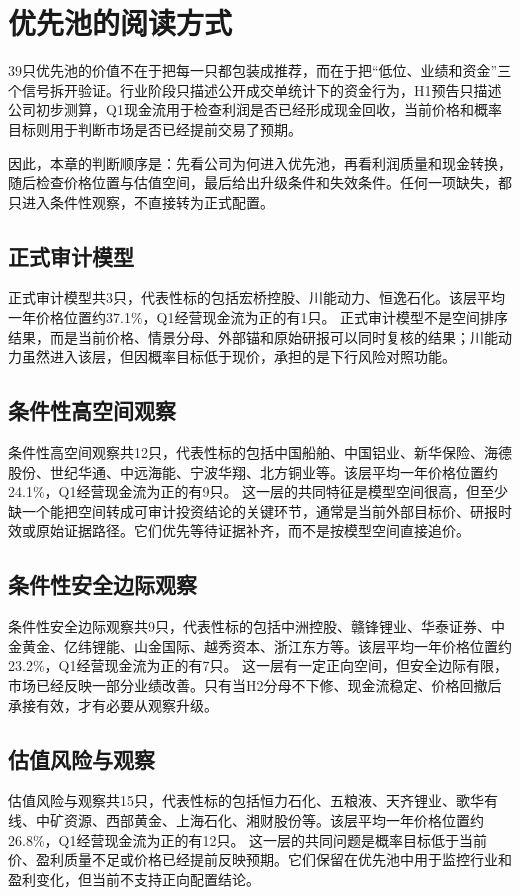 \normalsize

\section{优先池的阅读方式}

39只优先池的价值不在于把每一只都包装成推荐，而在于把“低位、业绩和资金”三个信号拆开验证。行业阶段只描述公开成交单统计下的资金行为，H1预告只描述公司初步测算，Q1现金流用于检查利润是否已经形成现金回收，当前价格和概率目标则用于判断市场是否已经提前交易了预期。

因此，本章的判断顺序是：先看公司为何进入优先池，再看利润质量和现金转换，随后检查价格位置与估值空间，最后给出升级条件和失效条件。任何一项缺失，都只进入条件性观察，不直接转为正式配置。
\subsection{正式审计模型}
正式审计模型共3只，代表性标的包括宏桥控股、川能动力、恒逸石化。该层平均一年价格位置约37.1\%，Q1经营现金流为正的有1只。
正式审计模型不是空间排序结果，而是当前价格、情景分母、外部锚和原始研报可以同时复核的结果；川能动力虽然进入该层，但因概率目标低于现价，承担的是下行风险对照功能。
\subsection{条件性高空间观察}
条件性高空间观察共12只，代表性标的包括中国船舶、中国铝业、新华保险、海德股份、世纪华通、中远海能、宁波华翔、北方铜业等。该层平均一年价格位置约24.1\%，Q1经营现金流为正的有9只。
这一层的共同特征是模型空间很高，但至少缺一个能把空间转成可审计投资结论的关键环节，通常是当前外部目标价、研报时效或原始证据路径。它们优先等待证据补齐，而不是按模型空间直接追价。
\subsection{条件性安全边际观察}
条件性安全边际观察共9只，代表性标的包括中洲控股、赣锋锂业、华泰证券、中金黄金、亿纬锂能、山金国际、越秀资本、浙江东方等。该层平均一年价格位置约23.2\%，Q1经营现金流为正的有7只。
这一层有一定正向空间，但安全边际有限，市场已经反映一部分业绩改善。只有当H2分母不下修、现金流稳定、价格回撤后承接有效，才有必要从观察升级。
\subsection{估值风险与观察}
估值风险与观察共15只，代表性标的包括恒力石化、五粮液、天齐锂业、歌华有线、中矿资源、西部黄金、上海石化、湘财股份等。该层平均一年价格位置约26.8\%，Q1经营现金流为正的有12只。
这一层的共同问题是概率目标低于当前价、盈利质量不足或价格已经提前反映预期。它们保留在优先池中用于监控行业和盈利变化，但当前不支持正向配置结论。
